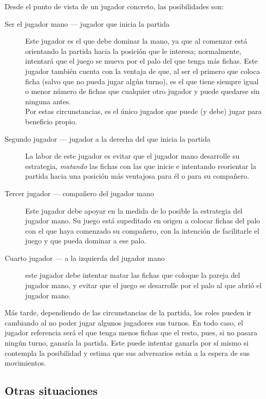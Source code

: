 Desde el punto de vista de un jugador concreto, las posibilidades son: \\
\begin{description}
    \item[Ser el jugador mano --- jugador que inicia la partida] Este jugador es el que debe dominar la mano, ya
        que al comenzar está orientando la partida hacia la posición que le interesa; normalmente, intentará
        que el juego se mueva por el palo del que tenga más fichas. Este jugador también cuenta
        con la ventaja de que, al ser el primero que coloca ficha (salvo que no pueda jugar algún turno), es el que tiene siempre igual o menor número
        de fichas que cualquier otro jugador y puede quedarse sin ninguna antes. \\
        Por estas circunstancias, es el único jugador que puede (y debe) jugar para beneficio propio.
    \item[Segundo jugador --- jugador a la derecha del que inicia la partida] La labor de este jugador es
        evitar que el jugador mano desarrolle su estrategia, \emph{matando} las fichas con las que inicie e intentando
        reorientar la partida hacia una posición más ventajosa para él o para su compañero.
    \item[Tercer jugador --- compañero del jugador mano] Este jugador debe apoyar en la medida de lo posible
        la estrategia del jugador mano. Su juego está supeditado en origen a colocar fichas del palo con el
        que haya comenzado su compañero, con la intención de facilitarle el juego y que pueda dominar a ese palo. 
    \item[Cuarto jugador --- a la izquierda del jugador mano] este jugador debe intentar matar las fichas que coloque
        la pareja del jugador mano, y evitar que el juego se desarrolle por el palo al que abrió el jugador mano.
\end{description}

Más tarde, dependiendo de las circunstancias de la partida, los roles
pueden ir cambiando al no poder jugar algunos jugadores sus turnos. En
todo caso, el jugador referencia será el que tenga menos fichas que el
resto, pues, si no pasara ningún turno, ganaría la partida. Este puede
intentar ganarla por sí mismo si contempla la posibilidad y estima que
sus adversarios están a la espera de sus movimientos.

\subsection{Otras situaciones}

